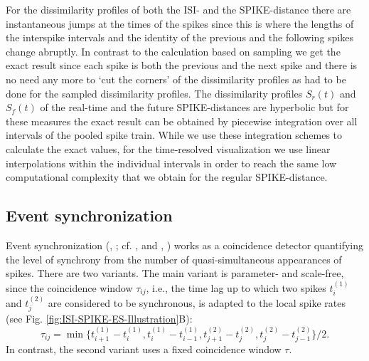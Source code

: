 \documentclass[10pt,twocolumn]{elsart5p}
\begin{document}
For the dissimilarity profiles of both the ISI- and the SPIKE-distance there are instantaneous jumps at the times of the spikes since this is where the lengths of the interspike intervals and the identity of the previous and the following spikes change abruptly. In contrast to the calculation based on sampling we get the exact result since each spike is both the previous and the next spike and there is no need any more to `cut the corners' of the dissimilarity profiles as had to be done for the sampled dissimilarity profiles. The dissimilarity profiles $S_r(t)$ and $S_f (t)$ of the real-time and the future SPIKE-distances are hyperbolic but for these measures the exact result can be obtained by piecewise integration over all intervals of the pooled spike train. While we use these integration schemes to calculate the exact values, for the time-resolved visualization we use linear interpolations within the individual intervals in order to reach the same low computational complexity that we obtain for the regular SPIKE-distance.



\subsection{\label{ss:Event-Synchronization} Event synchronization}

Event synchronization (\citeauthor{QuianQuiroga02b}, \citeyear{QuianQuiroga02b}; cf. \citeauthor{Kreuz07c}, \citeyear{Kreuz07c} and \citeauthor{Kreuz11b}, \citeyear{Kreuz11b}) works as a coincidence detector quantifying the level of synchrony from the number of quasi-simultaneous appearances of spikes. There are two variants. The main variant is parameter- and scale-free, since the coincidence window $\tau_{ij}$, i.e., the time lag  up to which two spikes $t_i^{(1)}$ and $t_j^{(2)}$ are considered to be synchronous, is adapted to the local spike rates (see Fig. \ref{fig:ISI-SPIKE-ES-Illustration}B):
%
\begin{equation} \label{eq:Event-MaxDist}
    \tau_{ij} = \min \{t_{i+1}^{(1)} - t_i^{(1)}, t_i^{(1)} - t_{i-1}^{(1)},
                           t_{j+1}^{(2)} - t_j^{(2)}, t_j^{(2)} - t_{j-1}^{(2)}\}/2.
\end{equation}
%
In contrast, the second variant uses a fixed coincidence window $\tau$.
\end{document}
